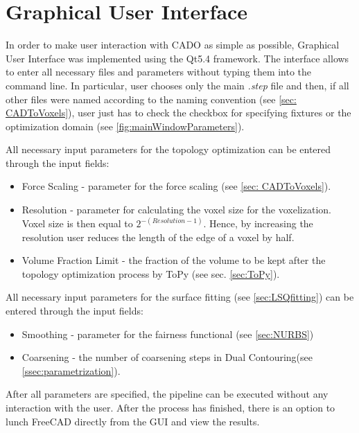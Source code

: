 \section{Graphical User Interface}
\label{sec:gui}
In order to make user interaction with CADO as simple as possible, Graphical User Interface was implemented using the Qt5.4 \cite{Qt} framework. 
The interface allows to enter all necessary files and parameters without typing them into the command line. In particular, user chooses only the main \textit{.step} file and then, if all other files were named according to the naming convention (see \autoref{sec: CADToVoxels}), user just has to check the checkbox for specifying fixtures or the optimization domain (see \autoref{fig:mainWindowParameters}).

All necessary input parameters for the topology optimization can be entered through the input fields:
\begin{itemize}
\item Force Scaling - parameter for the force scaling (see \autoref{sec: CADToVoxels}).
\item Resolution - parameter for calculating the voxel size for the voxelization. Voxel size is then equal to $2^{-(Resolution - 1)}$. Hence, by increasing the resolution user reduces the length of the edge of a voxel by half.
\item Volume Fraction Limit - the fraction of the volume to be kept after the topology optimization process by ToPy (see sec. \ref{sec:ToPy}).

\end{itemize}
All necessary input parameters for the surface fitting (see \autoref{sec:LSQfitting}) can be entered through the input fields:
\begin{itemize}
\item Smoothing - parameter for the fairness functional (see \autoref{sec:NURBS})
\item Coarsening - the number of coarsening steps in Dual Contouring(see \autoref{ssec:parametrization}).
\end{itemize}

After all parameters are specified, the pipeline can  be executed without any interaction with the user. After the process has finished, there is an option to lunch FreeCAD directly from the GUI  and view the results.

